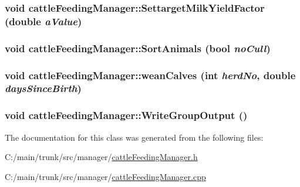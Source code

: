 \label{classcattle_feeding_manager_a777a9ea05ff6bf97d301ebaea5661dc0}
\hypertarget{classcattle_feeding_manager_a45e8328242ab6930b4b3c1fd08fb16af}{
\subsubsection[{SettargetMilkYieldFactor}]{\setlength{\rightskip}{0pt plus 5cm}void cattleFeedingManager::SettargetMilkYieldFactor (double {\em aValue})}}
\label{classcattle_feeding_manager_a45e8328242ab6930b4b3c1fd08fb16af}
\hypertarget{classcattle_feeding_manager_aa1a64042c6fec08dd81b692c94a00349}{
\subsubsection[{SortAnimals}]{\setlength{\rightskip}{0pt plus 5cm}void cattleFeedingManager::SortAnimals (bool {\em noCull})}}
\label{classcattle_feeding_manager_aa1a64042c6fec08dd81b692c94a00349}
\hypertarget{classcattle_feeding_manager_a02795723bb8cb2baab643f85962f2343}{
\subsubsection[{weanCalves}]{\setlength{\rightskip}{0pt plus 5cm}void cattleFeedingManager::weanCalves (int {\em herdNo}, \/  double {\em daysSinceBirth})}}
\label{classcattle_feeding_manager_a02795723bb8cb2baab643f85962f2343}
\hypertarget{classcattle_feeding_manager_ade877ad01c1b7137db6b1bbfaf26ac5f}{
\subsubsection[{WriteGroupOutput}]{\setlength{\rightskip}{0pt plus 5cm}void cattleFeedingManager::WriteGroupOutput ()}}
\label{classcattle_feeding_manager_ade877ad01c1b7137db6b1bbfaf26ac5f}


The documentation for this class was generated from the following files:\begin{DoxyCompactItemize}
\item 
C:/main/trunk/src/manager/\hyperlink{cattle_feeding_manager_8h}{cattleFeedingManager.h}\item 
C:/main/trunk/src/manager/\hyperlink{cattle_feeding_manager_8cpp}{cattleFeedingManager.cpp}\end{DoxyCompactItemize}
